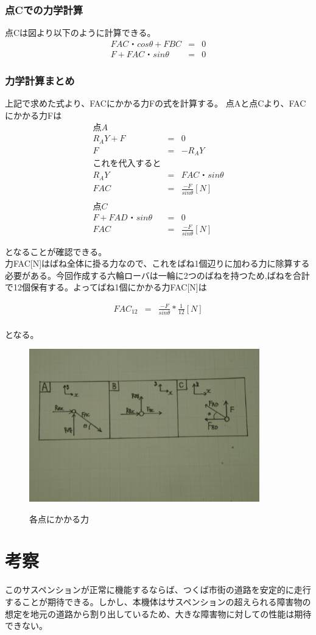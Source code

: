 \documentclass[11pt]{jsarticle}
\begin{document}
\subsubsection{点Cでの力学計算}
点Cは図より以下のように計算できる。
\begin{eqnarray}
	FAC・cosθ+FBC & = & 0 \\
	F+FAC・sinθ & = & 0
\end{eqnarray}

\subsubsection{力学計算まとめ}
上記で求めた式より、FACにかかる力Fの式を計算する。
点Aと点Cより、FACにかかる力Fは
\begin{eqnarray}
	点A\\ R_AY+F & = & 0 \\
		F & = & -R_AY \\ 
		{これを代入すると} \\
	　　　　R_AY & = & FAC・sinθ \\
		FAC & = & \frac{-F}{sinθ} [N] \\
		\\
	点C\\ F+FAD・sinθ & = & 0 \\
	FAC & = & \frac{-F}{sinθ} [N]
\end{eqnarray}

となることが確認できる。　\\
力FAC[N]はばね全体に掛る力なので、これをばね1個辺りに加わる力に除算する必要がある。今回作成する六輪ローバは一輪に2つのばねを持つため,ばねを合計で12個保有する。よってばね1個にかかる力FAC[N]は

\begin{eqnarray}
	FAC_12 & = & \frac{-F}{sinθ}*\frac{1}{12} [N] \\
\end{eqnarray}

となる。




\begin{figure}[htbt]
 \begin{center}
  \includegraphics[width=100mm]{bai.jpg}
 　\caption{各点にかかる力}
  \label{fig:bai}%
 \end{center}
\end{figure}





\section{考察}
このサスペンションが正常に機能するならば、つくば市街の道路を安定的に走行することが期待できる。しかし、本機体はサスペンションの超えられる障害物の想定を地元の道路から割り出しているため、大きな障害物に対しての性能は期待できない。
\end{document}
